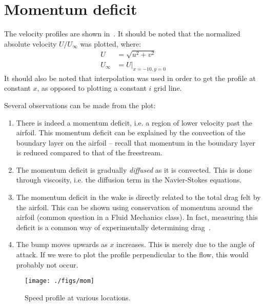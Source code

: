 \section{Momentum deficit}
The velocity profiles are shown in~. It should be noted that the normalized
absolute velocity $U/U_\infty$ was plotted, where:
\begin{align*}
    U &= \sqrt{u^2 + v^2}\\
    U_\infty &= U\big|_{x=-10, y=0}
\end{align*}
It should also be noted that interpolation was used in order to get the profile at constant
$x$, as opposed to plotting a constant $i$ grid line.

Several observations can be made from the plot:
\begin{enumerate}
    \item There is indeed a momentum deficit, i.e. a region of lower velocity past the airfoil. This
        momentum deficit can be explained by the convection of the boundary layer on the airfoil --
        recall that momentum in the boundary layer is reduced compared to that of the freestream.
    \item The momentum deficit is gradually \textit{diffused} as it
        is convected. This is done through viscosity,
        i.e. the diffusion term in the Navier-Stokes equations.
    \item The momentum deficit in the wake is directly related to the total drag felt by the
        airfoil. This can be shown using conservation of momentum around the airfoil (common
        question in a Fluid Mechanics class). In fact, measuring this deficit is a common
        way of experimentally determining drag~\cite{genc}.
    \item The bump moves upwards as $x$ increases. This is merely due to the angle of attack.
        If we were to plot the profile perpendicular to the flow, this would probably not
        occur.
\end{enumerate}
\begin{figure}
    \centering
    \texttt{[image: ./figs/mom]}
    \caption{Speed profile at various locations.}\label{fig:mom}
\end{figure}

